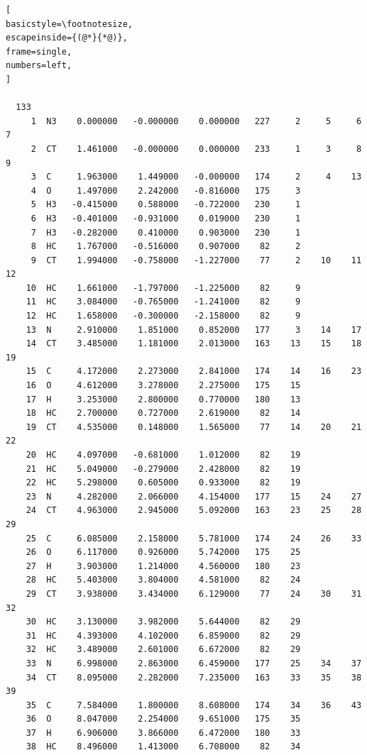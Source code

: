 \documentclass[a4paper,11pt]{scrartcl}
\begin{document}
\begin{lstlisting}[
basicstyle=\footnotesize,
escapeinside={(@*}{*@)},
frame=single,
numbers=left,
]

  133
     1  N3    0.000000   -0.000000    0.000000   227     2     5     6     7
     2  CT    1.461000   -0.000000    0.000000   233     1     3     8     9
     3  C     1.963000    1.449000   -0.000000   174     2     4    13
     4  O     1.497000    2.242000   -0.816000   175     3
     5  H3   -0.415000    0.588000   -0.722000   230     1
     6  H3   -0.401000   -0.931000    0.019000   230     1
     7  H3   -0.282000    0.410000    0.903000   230     1
     8  HC    1.767000   -0.516000    0.907000    82     2
     9  CT    1.994000   -0.758000   -1.227000    77     2    10    11    12
    10  HC    1.661000   -1.797000   -1.225000    82     9
    11  HC    3.084000   -0.765000   -1.241000    82     9
    12  HC    1.658000   -0.300000   -2.158000    82     9
    13  N     2.910000    1.851000    0.852000   177     3    14    17
    14  CT    3.485000    1.181000    2.013000   163    13    15    18    19
    15  C     4.172000    2.273000    2.841000   174    14    16    23
    16  O     4.612000    3.278000    2.275000   175    15
    17  H     3.253000    2.800000    0.770000   180    13
    18  HC    2.700000    0.727000    2.619000    82    14
    19  CT    4.535000    0.148000    1.565000    77    14    20    21    22
    20  HC    4.097000   -0.681000    1.012000    82    19
    21  HC    5.049000   -0.279000    2.428000    82    19
    22  HC    5.298000    0.605000    0.933000    82    19
    23  N     4.282000    2.066000    4.154000   177    15    24    27
    24  CT    4.963000    2.945000    5.092000   163    23    25    28    29
    25  C     6.085000    2.158000    5.781000   174    24    26    33
    26  O     6.117000    0.926000    5.742000   175    25
    27  H     3.903000    1.214000    4.560000   180    23
    28  HC    5.403000    3.804000    4.581000    82    24
    29  CT    3.938000    3.434000    6.129000    77    24    30    31    32
    30  HC    3.130000    3.982000    5.644000    82    29
    31  HC    4.393000    4.102000    6.859000    82    29
    32  HC    3.489000    2.601000    6.672000    82    29
    33  N     6.998000    2.863000    6.459000   177    25    34    37
    34  CT    8.095000    2.282000    7.235000   163    33    35    38    39
    35  C     7.584000    1.800000    8.608000   174    34    36    43
    36  O     8.047000    2.254000    9.651000   175    35
    37  H     6.906000    3.866000    6.472000   180    33
    38  HC    8.496000    1.413000    6.708000    82    34

\end{lstlisting}
\end{document}
